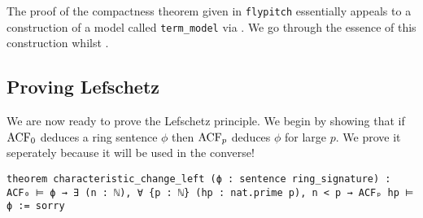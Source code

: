 \begin{rmk}
  The proof of the compactness theorem given in \texttt{flypitch} essentially
  appeals to a construction of a model called
  \texttt{term\_model} via .
  We go through the essence of this construction whilst
  .
\end{rmk}

\subsection{Proving Lefschetz}

We are now ready to prove the Lefschetz principle.
We begin by showing that if $\operatorname{ACF}_{0}$ deduces a ring sentence $\phi$
then $\operatorname{ACF}_{p}$ deduces $\phi$ for large $p$.
We prove it seperately because it will be used in the converse!

\begin{lstlisting}
theorem characteristic_change_left (ϕ : sentence ring_signature) :
ACF₀ ⊨ ϕ → ∃ (n : ℕ), ∀ {p : ℕ} (hp : nat.prime p), n < p → ACFₚ hp ⊨ ϕ := sorry \end{lstlisting}

